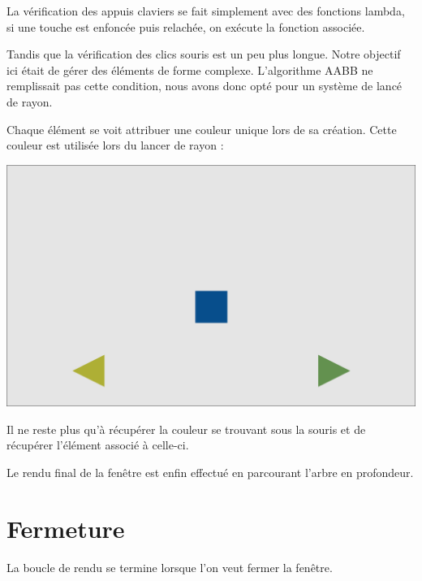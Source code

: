 \documentclass[a4paper]{report}
\begin{document}
    \vspace{5mm}

    La vérification des appuis claviers se fait simplement avec des fonctions lambda, si une touche est enfoncée puis
    relachée, on exécute la fonction associée.

    \vspace{5mm}

    Tandis que la vérification des clics souris est un peu plus longue. Notre objectif ici était de gérer des éléments de
    forme complexe. L'algorithme AABB ne remplissait pas cette condition, nous avons donc opté pour un système de lancé
    de rayon.

    \vspace{5mm}
    Chaque élément se voit attribuer une couleur unique lors de sa création. Cette couleur est utilisée lors du lancer de
    rayon :

\begin{center}
    \includegraphics[scale=0.3]{Analyse/Click.png}
\end{center}

    Il ne reste plus qu'à récupérer la couleur se trouvant sous la souris et de récupérer l'élément associé à celle-ci.

    \vspace{5mm}

    Le rendu final de la fenêtre est enfin effectué en parcourant l'arbre en profondeur.

    \section{Fermeture}

    La boucle de rendu se termine lorsque l'on veut fermer la fenêtre.
\end{document}
